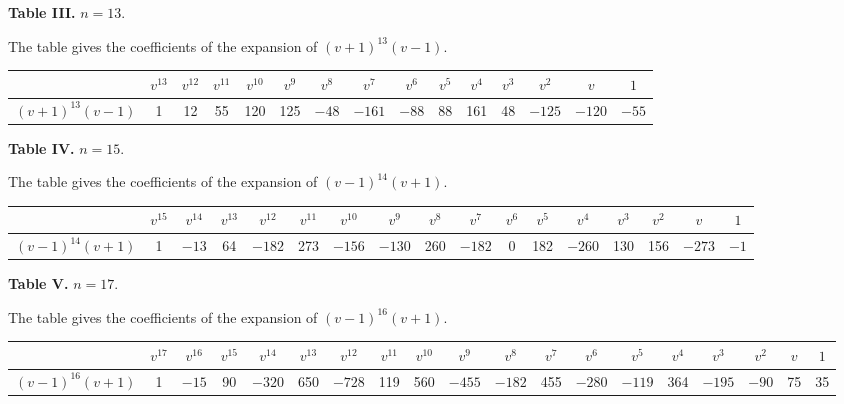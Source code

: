 \documentclass[12pt,a4paper]{article}
\begin{document}
\medskip

\noindent\textbf{Table III.} $n = 13$.

\medskip

\noindent
The table gives the coefficients of the expansion of $(v+1)^{13}(v-1)$.

\begin{center}
\begin{tabular}{|c|c|c|c|c|c|c|c|c|c|c|c|c|c|c|}
\hline
& $v^{13}$ & $v^{12}$ & $v^{11}$ & $v^{10}$ & $v^9$ & $v^8$ & $v^7$ & $v^6$ & $v^5$ & $v^4$ & $v^3$ & $v^2$ & $v$ & $1$ \\
\hline
$(v+1)^{13}(v-1)$ & 1 & 12 & 55 & 120 & 125 & $-48$ & $-161$ & $-88$ & 88 & 161 & 48 & $-125$ & $-120$ & $-55$ \\
\hline
\end{tabular}
\end{center}

\medskip

\noindent\textbf{Table IV.} $n = 15$.

\medskip

\noindent
The table gives the coefficients of the expansion of $(v-1)^{14}(v+1)$.

\begin{center}
\begin{tabular}{|c|c|c|c|c|c|c|c|c|c|c|c|c|c|c|c|c|}
\hline
& $v^{15}$ & $v^{14}$ & $v^{13}$ & $v^{12}$ & $v^{11}$ & $v^{10}$ & $v^9$ & $v^8$ & $v^7$ & $v^6$ & $v^5$ & $v^4$ & $v^3$ & $v^2$ & $v$ & $1$ \\
\hline
$(v-1)^{14}(v+1)$ & 1 & $-13$ & 64 & $-182$ & 273 & $-156$ & $-130$ & 260 & $-182$ & 0 & 182 & $-260$ & 130 & 156 & $-273$ & $-1$ \\
\hline
\end{tabular}
\end{center}

\medskip

\noindent\textbf{Table V.} $n = 17$.

\medskip

\noindent
The table gives the coefficients of the expansion of $(v-1)^{16}(v+1)$.

\begin{center}
\begin{tabular}{|c|c|c|c|c|c|c|c|c|c|c|c|c|c|c|c|c|c|c|}
\hline
& $v^{17}$ & $v^{16}$ & $v^{15}$ & $v^{14}$ & $v^{13}$ & $v^{12}$ & $v^{11}$ & $v^{10}$ & $v^9$ & $v^8$ & $v^7$ & $v^6$ & $v^5$ & $v^4$ & $v^3$ & $v^2$ & $v$ & $1$ \\
\hline
$(v-1)^{16}(v+1)$ & 1 & $-15$ & 90 & $-320$ & 650 & $-728$ & 119 & 560 & $-455$ & $-182$ & 455 & $-280$ & $-119$ & 364 & $-195$ & $-90$ & 75 & 35 \\
\hline
\end{tabular}
\end{center}
\end{document}
